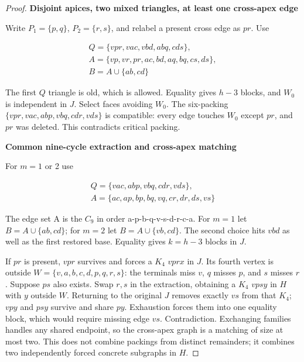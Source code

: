 \documentclass[11pt]{article}
\theoremstyle{definition}\newtheorem{definition}[theorem]{Definition}
\theoremstyle{remark}\newtheorem{remark}[theorem]{Remark}
\begin{document}
\begin{proof}
\par\medskip\noindent\textbf{Disjoint apices, two mixed triangles, at least one cross-apex edge}\label{disjoint-apices-two-mixed-triangles-at-least-one-cross-apex-edge}

Write \(P_1=\{p,q\}\), \(P_2=\{r,s\}\), and relabel a present cross edge as \(pr\). Use

\begin{equation}
\begin{gathered}
Q = \{vpr,vac,vbd,abq,cds\}, \\
A = \{vp,vr,pr,ac,bd,aq,bq,cs,ds\}, \\
B = A\cup \{ab,cd\}
\end{gathered}
\end{equation}

The first \(Q\) triangle is old, which is allowed. Equality gives \(h-3\) blocks, and \(W_0\) is independent in \(J\). Select faces avoiding \(W_0\). The six-packing \(\{vpr,vac,abp,vbq,cdr,vds\}\) is compatible: every edge touches \(W_0\) except \(pr\), and \(pr\) was deleted. This contradicts critical packing.

\par\medskip\noindent\textbf{Common nine-cycle extraction and cross-apex matching}\label{common-nine-cycle-extraction-and-cross-apex-matching}

For \(m=1\) or 2 use

\begin{equation}
\begin{gathered}
Q = \{vac,abp,vbq,cdr,vds\}, \\
A = \{ac,ap,bp,bq,vq,cr,dr,ds,vs\}
\end{gathered}
\end{equation}

The edge set A is the \(C_9\) in order a-p-b-q-v-s-d-r-c-a. For \(m=1\) let \(B=A \cup \{ab,cd\}\); for \(m=2\) let \(B=A \cup \{vb,cd\}\). The second choice hits \(vbd\) as well as the first restored base. Equality gives \(k=h-3\) blocks in \(J\).

If \(pr\) is present, \(vpr\) survives and forces a \(K_4\) \(vprx\) in \(J\). Its fourth vertex is outside \(W=\{v,a,b,c,d,p,q,r,s\}\): the terminals miss \(v\), \(q\) misses \(p\), and \(s\) misses \(r\). Suppose \(ps\) also exists. Swap \(r,s\) in the extraction, obtaining a \(K_4\) \(vpsy\) in \(H\) with \(y\) outside \(W\). Returning to the original \(J\) removes exactly \(vs\) from that \(K_4\); \(vpy\) and \(psy\) survive and share \(py\). Exhaustion forces them into one equality block, which would require missing edge \(vs\). Contradiction. Exchanging families handles any shared endpoint, so the cross-apex graph is a matching of size at most two. This does not combine packings from distinct remainders; it combines two independently forced concrete subgraphs in \(H\).


\end{proof}
\end{document}
